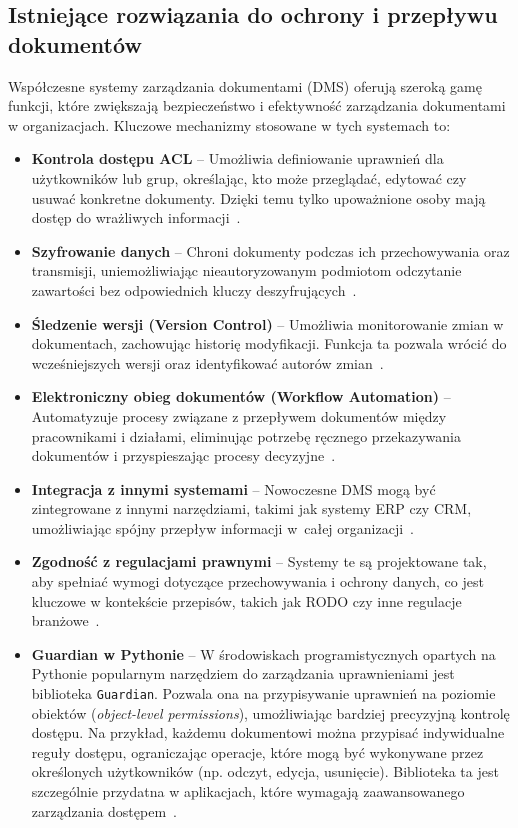 \subsection{Istniejące rozwiązania do ochrony i przepływu dokumentów}

Współczesne systemy zarządzania dokumentami (DMS) oferują szeroką gamę funkcji, które zwiększają bezpieczeństwo i efektywność zarządzania dokumentami w organizacjach. Kluczowe mechanizmy stosowane w tych systemach to:

\begin{itemize}
	\item \textbf{Kontrola dostępu ACL} -- Umożliwia definiowanie uprawnień dla użytkowników lub grup, określając, kto może przeglądać, edytować czy usuwać konkretne dokumenty. Dzięki temu tylko upoważnione osoby mają dostęp do wrażliwych informacji~\cite{acl, acl_2}.
	
	\item \textbf{Szyfrowanie danych} -- Chroni dokumenty podczas ich przechowywania oraz transmisji, uniemożliwiając nieautoryzowanym podmiotom odczytanie zawartości bez odpowiednich kluczy deszyfrujących~\cite{szyrowanie_danych}.

	\item \textbf{Śledzenie wersji (Version Control)} -- Umożliwia monitorowanie zmian w dokumentach, zachowując historię modyfikacji. Funkcja ta pozwala wrócić do wcześniejszych wersji oraz identyfikować autorów zmian~\cite{kotntrola_wersji}. 
	
	\item \textbf{Elektroniczny obieg dokumentów (Workflow Automation)} -- Automatyzuje procesy związane z przepływem dokumentów między pracownikami i działami, eliminując potrzebę ręcznego przekazywania dokumentów i przyspieszając procesy decyzyjne~\cite{workflow_utomation}.

	\item \textbf{Integracja z innymi systemami} -- Nowoczesne DMS mogą być zintegrowane z innymi narzędziami, takimi jak systemy ERP czy CRM, umożliwiając spójny przepływ informacji w~całej organizacji~\cite{dms}. 

	\item \textbf{Zgodność z regulacjami prawnymi} -- Systemy te są projektowane tak, aby spełniać wymogi dotyczące przechowywania i ochrony danych, co jest kluczowe w kontekście przepisów, takich jak RODO czy inne regulacje branżowe~\cite{rodo_dokumenty}.
	
	\item \textbf{Guardian w Pythonie} -- W środowiskach programistycznych opartych na Pythonie popularnym narzędziem do zarządzania uprawnieniami jest biblioteka \texttt{Guardian}. Pozwala ona na przypisywanie uprawnień na poziomie obiektów (\emph{object-level permissions}), umożliwiając bardziej precyzyjną kontrolę dostępu. Na przykład, każdemu dokumentowi można przypisać indywidualne reguły dostępu, ograniczając operacje, które mogą być wykonywane przez określonych użytkowników (np. odczyt, edycja, usunięcie). Biblioteka ta jest szczególnie przydatna w aplikacjach, które wymagają zaawansowanego zarządzania dostępem~\cite{django_guardian}.
\end{itemize}

